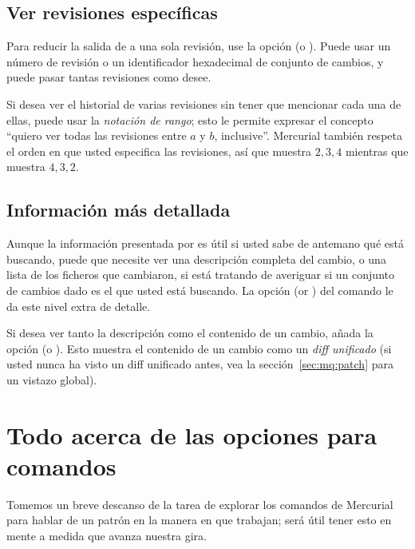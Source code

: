 \subsection{Ver revisiones específicas}

Para reducir la salida de  a una sola revisión, use la  
opción  (o ).  Puede usar un número
de revisión o un identificador hexadecimal de conjunto de cambios, y
puede pasar tantas revisiones como desee.


Si desea ver el historial de varias revisiones sin tener que mencionar
cada una de ellas, puede usar la \emph{notación de rango}; esto le
permite expresar el concepto ``quiero ver todas las revisiones entre
$a$ y $b$, inclusive''.
Mercurial también respeta el orden en que usted especifica las
revisiones, así que  muestra $2,3,4$ mientras
que  muestra $4,3,2$.

\subsection{Información más detallada}
Aunque la información presentada por  es útil si usted sabe
de antemano qué está buscando, puede que necesite ver una descripción
completa del cambio, o una lista de los ficheros que cambiaron, si
está tratando de averiguar si un conjunto de cambios dado es el que
usted está buscando. La opción  (or ) del
comando  le da este nivel extra de detalle.

Si desea ver tanto la descripción como el contenido de un cambio,
añada la opción  (o ). Esto muestra
el contenido de un cambio como un \emph{diff unificado} (si usted
nunca ha visto un diff unificado antes, vea la
sección~\ref{sec:mq:patch} para un vistazo global).

\section{Todo acerca de las opciones para comandos}

Tomemos un breve descanso de la tarea de explorar los comandos de
Mercurial para hablar de un patrón en la manera en que trabajan; será
útil tener esto en mente a medida que avanza nuestra gira.

